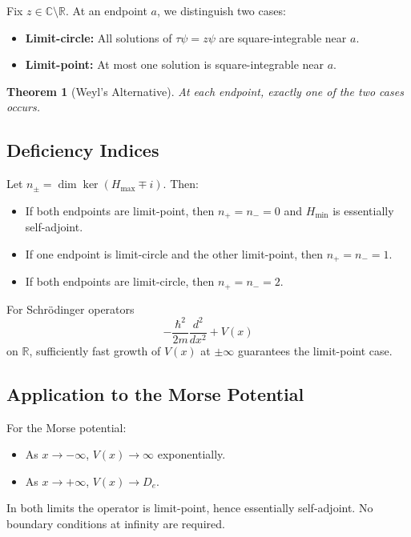 \documentclass[11pt]{article}
\newtheorem{theorem}{Theorem}
\begin{document}
Fix $z\in\mathbb C\setminus\mathbb R$.
At an endpoint $a$, we distinguish two cases:

\begin{itemize}
\item \textbf{Limit-circle:} All solutions of
      $\tau\psi=z\psi$ are square-integrable near $a$.
\item \textbf{Limit-point:} At most one solution is square-integrable near $a$.
\end{itemize}

\begin{theorem}[Weyl’s Alternative]
At each endpoint, exactly one of the two cases occurs.
\end{theorem}

\subsection*{Deficiency Indices}

Let $n_\pm=\dim\ker(H_{\max}\mp i)$.
Then:

\begin{itemize}
\item If both endpoints are limit-point,
      then $n_+=n_-=0$ and $H_{\min}$ is essentially self-adjoint.
\item If one endpoint is limit-circle and the other limit-point,
      then $n_+=n_-=1$.
\item If both endpoints are limit-circle,
      then $n_+=n_-=2$.
\end{itemize}

For Schr\"odinger operators
\[
-\frac{\hbar^2}{2m}\frac{d^2}{dx^2}+V(x)
\]
on $\mathbb R$, sufficiently fast growth of $V(x)$ at
$\pm\infty$ guarantees the limit-point case.

\subsection*{Application to the Morse Potential}

For the Morse potential:

\begin{itemize}
\item As $x\to -\infty$, $V(x)\to\infty$ exponentially.
\item As $x\to +\infty$, $V(x)\to D_e$.
\end{itemize}

In both limits the operator is limit-point,
hence essentially self-adjoint.
No boundary conditions at infinity are required.
\end{document}
